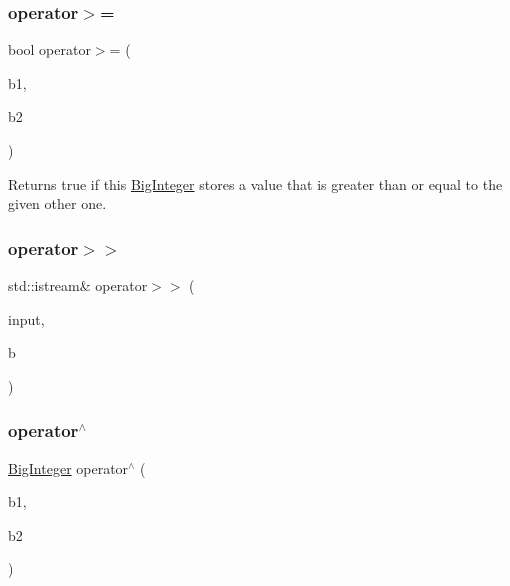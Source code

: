 \subsubsection{\texorpdfstring{operator$>$=}{operator>=}}
{\footnotesize\ttfamily bool operator$>$= (\begin{DoxyParamCaption}\item[{const \mbox{\hyperlink{classBigInteger}{Big\+Integer}} \&}]{b1,  }\item[{const \mbox{\hyperlink{classBigInteger}{Big\+Integer}} \&}]{b2 }\end{DoxyParamCaption})\hspace{0.3cm}{\ttfamily [friend]}}



Returns true if this \mbox{\hyperlink{classBigInteger}{Big\+Integer}} stores a value that is greater than or equal to the given other one. 

\mbox{\label{classBigInteger_ab3c25317df8d1955db53a700f10e6edc}} 
\subsubsection{\texorpdfstring{operator$>$$>$}{operator>>}}
{\footnotesize\ttfamily std\+::istream\& operator$>$$>$ (\begin{DoxyParamCaption}\item[{std\+::istream \&}]{input,  }\item[{\mbox{\hyperlink{classBigInteger}{Big\+Integer}} \&}]{b }\end{DoxyParamCaption})\hspace{0.3cm}{\ttfamily [friend]}}

\mbox{\label{classBigInteger_a7a93a422d668c89ff99135bff3f3d6eb}} 
\subsubsection{\texorpdfstring{operator$^\wedge$}{operator^}}
{\footnotesize\ttfamily \mbox{\hyperlink{classBigInteger}{Big\+Integer}} operator$^\wedge$ (\begin{DoxyParamCaption}\item[{const \mbox{\hyperlink{classBigInteger}{Big\+Integer}} \&}]{b1,  }\item[{const \mbox{\hyperlink{classBigInteger}{Big\+Integer}} \&}]{b2 }\end{DoxyParamCaption})\hspace{0.3cm}{\ttfamily [friend]}}



